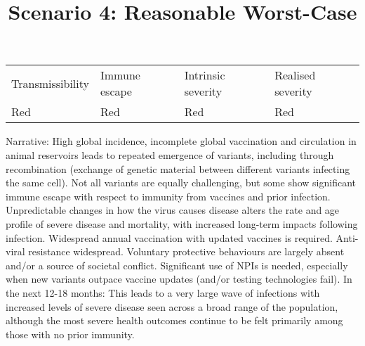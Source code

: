 \documentclass{article}
\begin{document}
\title{Scenario 4: Reasonable Worst-Case}

\maketitle





\begin{tabu} to \textwidth { |X|X|X|X| }
\hline



Transmissibility   & Immune escape  & Intrinsic severity & Realised severity
 \\


Red & Red & Red & Red
 \\
\hline

\end{tabu}




Narrative: High global incidence, incomplete global vaccination and circulation in animal reservoirs leads to repeated emergence of variants, including through recombination (exchange of genetic material between different variants infecting the same cell). Not all variants are equally challenging, but some show significant immune escape with respect to immunity from vaccines and prior infection. Unpredictable changes in how the virus causes disease alters the rate and age profile of severe disease and mortality, with increased long-term impacts following infection. Widespread annual vaccination with updated vaccines is required. Anti-viral resistance widespread. Voluntary protective behaviours are largely absent and/or a source of societal conflict. Significant use of NPIs is needed, especially when new variants outpace vaccine updates (and/or testing technologies fail). In the next 12-18 months: This leads to a very large wave of infections with increased levels of severe disease seen across a broad range of the population, although the most severe health outcomes continue to be felt primarily among those with no prior immunity.
\end{document}
